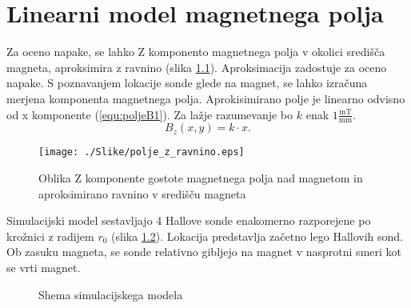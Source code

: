 \chapter{Linearni model magnetnega polja}
\label{linearnimodel}

Za oceno napake, se lahko Z komponento magnetnega polja v okolici središča magneta, aproksimira z ravnino (slika \ref{polje_z_ravnino}).
Aproksimacija zadostuje za oceno napake. S poznavanjem lokacije sonde glede na magnet, se lahko izračuna merjena komponenta magnetnega polja. Aprokisimirano polje je linearno odvisno od x komponente (\ref{equ:poljeB1}).  Za lažje razumevanje bo $k$ enak $1\frac{\mathrm{mT}}{\mathrm{mm}}$.
\begin{equation}
\label{equ:lin_polje}
B_z(x,y)=k\cdot x.
\end{equation}
\begin{figure}[ht]
	\centering
	\texttt{[image: ./Slike/polje\_z\_ravnino.eps]}
	\caption{Oblika Z komponente gostote magnetnega polja nad magnetom in aproksimirano ravnino v središču magneta}
	\label{polje_z_ravnino}
\end{figure}
\newpage

Simulacijski model sestavljajo 4 Hallove sonde enakomerno razporejene po krožnici z radijem $r_0$ (slika \ref{lin_simul}). Lokacija predstavlja začetno lego Hallovih sond. 
Ob zasuku magneta, se sonde relativno gibljejo na magnet v nasprotni smeri kot se vrti magnet. 
\begin{figure}[!ht]
	\centering
	\caption{Shema simulacijskega modela}
	\label{lin_simul}
\end{figure}

